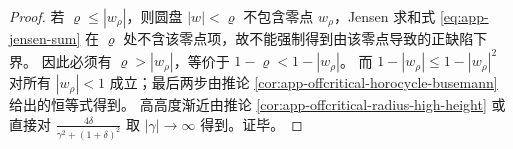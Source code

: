 \begin{proof}
若 \(\varrho\le |w_{\rho}|\)，则圆盘 \(|w|<\varrho\) 不包含零点 \(w_{\rho}\)，Jensen 求和式 \eqref{eq:app-jensen-sum} 在 \(\varrho\) 处不含该零点项，故不能强制得到由该零点导致的正缺陷下界。
因此必须有 \(\varrho>|w_{\rho}|\)，等价于 \(1-\varrho<1-|w_{\rho}|\)。
而 \(1-|w_{\rho}|\le 1-|w_{\rho}|^{2}\) 对所有 \(|w_{\rho}|<1\) 成立；最后两步由推论 \ref{cor:app-offcritical-horocycle-busemann} 给出的恒等式得到。
高高度渐近由推论 \ref{cor:app-offcritical-radius-high-height} 或直接对 \(\frac{4\delta}{\gamma^{2}+(1+\delta)^{2}}\) 取 \(|\gamma|\to\infty\) 得到。证毕。
\end{proof}

\endinput

